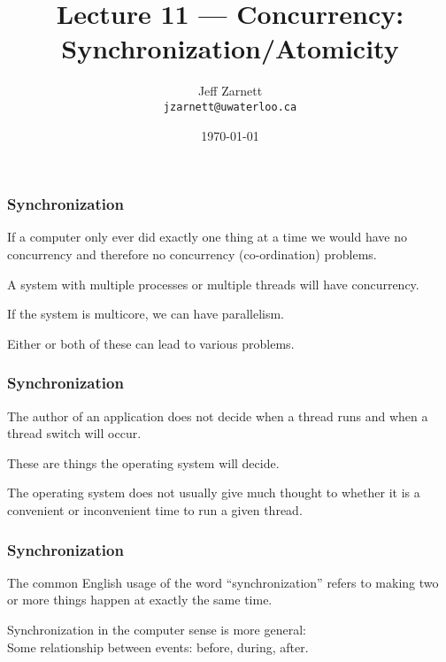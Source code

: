 

\title{Lecture 11 --- Concurrency: Synchronization/Atomicity }

\author{Jeff Zarnett \\ \small \texttt{jzarnett@uwaterloo.ca}}
\date{\today}




\begin{frame}
  \titlepage

 \end{frame}


\begin{frame}
\frametitle{Synchronization}

If a computer only ever did exactly one thing at a time we would have no concurrency and therefore no concurrency (co-ordination) problems. 

A system with multiple processes or multiple threads will have concurrency.

If the system is multicore, we can have parallelism.

Either or both of these can lead to various problems.


\end{frame}

\begin{frame}
\frametitle{Synchronization}

The author of an application does not decide when a thread runs and when a thread switch will occur. 

These are things the operating system will decide. 

The operating system does not usually give much thought to whether it is a convenient or inconvenient time to run a given thread.


\end{frame}

\begin{frame}
\frametitle{Synchronization}

The common English usage of the word ``synchronization'' refers to making two or more things happen at exactly the same time. 

Synchronization in the computer sense is more general:\\
\quad Some relationship between events: before, during, after. 

\end{frame}

